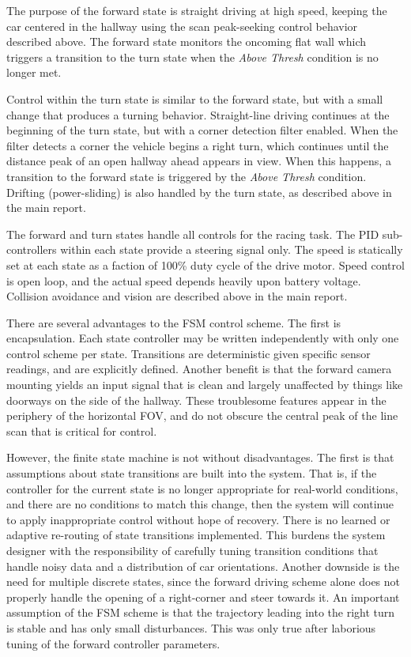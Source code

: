 \documentclass[letterpaper, 10 pt, conference]{ieeeconf}  %
\begin{document}
The purpose of the forward state is straight driving at high speed, keeping the car centered in the hallway using the scan peak-seeking control behavior described above.  The forward state monitors the oncoming flat wall which triggers a transition to the turn state when the \textit{Above Thresh} condition is no longer met.

Control within the turn state is similar to the forward state, but with a small change that produces a turning behavior.  Straight-line driving continues at the beginning of the turn state, but with a corner detection filter enabled.  When the filter detects a corner the vehicle begins a right turn, which continues until the distance peak of an open hallway ahead appears in view.  When this happens, a transition to the forward state is triggered by the \textit{Above Thresh} condition.  Drifting (power-sliding) is also handled by the turn state, as described above in the main report.

The forward and turn states handle all controls for the racing task.  The PID sub-controllers within each state provide a steering signal only.  The speed is statically set at each state as a faction of 100\% duty cycle of the drive motor.  Speed control is open loop, and the actual speed depends heavily upon battery voltage.  Collision avoidance and vision are described above in the main report.

There are several advantages to the FSM control scheme.  The first is encapsulation.  Each state controller may be written independently with only one control scheme per state.  Transitions are deterministic given specific sensor readings, and are explicitly defined.  Another benefit is that the forward camera mounting yields an input signal that is clean and largely unaffected by things like doorways on the side of the hallway.  These troublesome features appear in the periphery of the horizontal FOV, and do not obscure the central peak of the line scan that is critical for control. 

However, the finite state machine is not without disadvantages.  The first is that assumptions about state transitions are built into the system.  That is, if the controller for the current state is no longer appropriate for real-world conditions, and there are no conditions to match this change, then the system will continue to apply inappropriate control without hope of recovery.  There is no learned or adaptive re-routing of state transitions implemented.  This burdens the system designer with the responsibility of carefully tuning transition conditions that handle noisy data and a distribution of car orientations.  Another downside is the need for multiple discrete states, since the forward driving scheme alone does not properly handle the opening of a right-corner and steer towards it.  An important assumption of the FSM scheme is that the trajectory leading into the right turn is stable and has only small disturbances.  This was only true after laborious tuning of the forward controller parameters.
\end{document}

